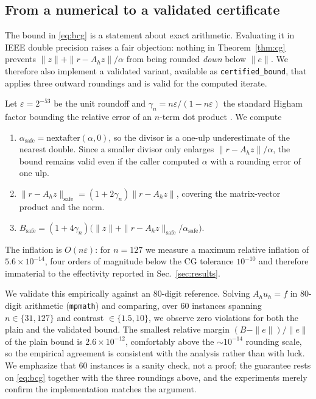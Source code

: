 \documentclass[journal]{IEEEtran}
\theoremstyle{plain}
\theoremstyle{definition}
\begin{document}
\subsection{From a numerical to a validated certificate}
\label{sec:validated}
The bound in \eqref{eq:bcg} is a statement about exact arithmetic. Evaluating it in
IEEE double precision raises a fair objection: nothing in Theorem~\ref{thm:cg} prevents
$\|z\|+\|r-A_hz\|/\alpha$ from being rounded \emph{down} below $\|e\|$. We therefore
also implement a validated variant, available as \texttt{certified\_bound}, that applies
three outward roundings and is valid for the computed iterate.

Let $\varepsilon=2^{-53}$ be the unit roundoff and
$\gamma_n=n\varepsilon/(1-n\varepsilon)$ the standard Higham factor bounding the
relative error of an $n$-term dot product \cite{higham2002accuracy}. We compute
\begin{enumerate}
\item $\alpha_{\mathrm{safe}} = \mathrm{nextafter}(\alpha,0)$, so the divisor is a
one-ulp underestimate of the nearest double. Since a smaller divisor only enlarges
$\|r-A_hz\|/\alpha$, the bound remains valid even if the caller computed $\alpha$ with
a rounding error of one ulp.
\item $\|r-A_hz\|_{\mathrm{safe}} = (1+2\gamma_n)\|r-A_hz\|$, covering the
matrix-vector product and the norm.
\item $B_{\mathrm{safe}} = (1+4\gamma_n)\bigl(\|z\|+\|r-A_hz\|_{\mathrm{safe}}/\alpha_{\mathrm{safe}}\bigr)$.
\end{enumerate}
The inflation is $O(n\varepsilon)$: for $n=127$ we measure a maximum relative
inflation of $5.6\times10^{-14}$, four orders of magnitude below the CG tolerance
$10^{-10}$ and therefore immaterial to the effectivity reported in
Sec.~\ref{sec:results}.

We validate this empirically against an $80$-digit reference. Solving
$A_hu_h=f$ in 80-digit arithmetic (\texttt{mpmath}) and comparing, over $60$ instances
spanning $n\in\{31,127\}$ and contrast $\in\{1.5,10\}$, we observe zero violations for
both the plain and the validated bound. The smallest relative margin
$(B-\|e\|)/\|e\|$ of the plain bound is $2.6\times10^{-12}$, comfortably above the
$\sim10^{-14}$ rounding scale, so the empirical agreement is consistent with the
analysis rather than with luck. We emphasize that $60$ instances is a sanity check,
not a proof; the guarantee rests on \eqref{eq:bcg} together with the three roundings
above, and the experiments merely confirm the implementation matches the argument.
\end{document}
